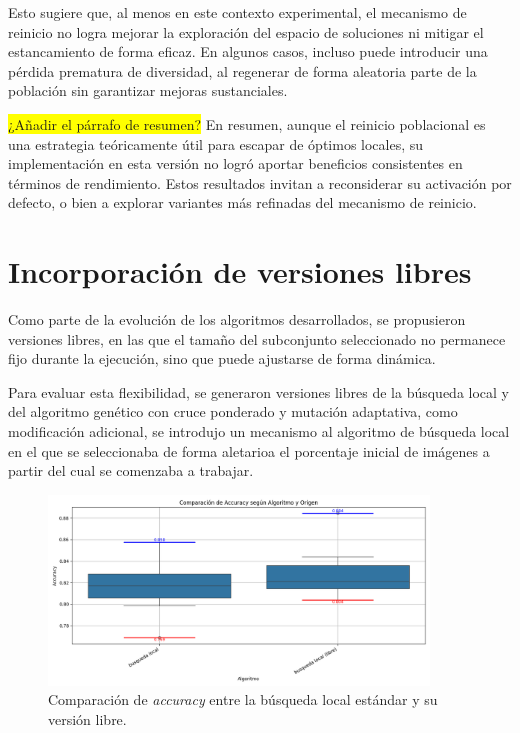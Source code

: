 Esto sugiere que, al menos en este contexto experimental, el mecanismo de reinicio no logra mejorar la exploración del espacio de soluciones 
ni mitigar el estancamiento de forma eficaz.
En algunos casos, incluso puede introducir una pérdida prematura de diversidad, al regenerar de forma aleatoria parte de la población sin garantizar mejoras sustanciales.

\colorbox{yellow}{¿Añadir el párrafo de resumen?}
En resumen, aunque el reinicio poblacional es una estrategia teóricamente útil para escapar de óptimos locales,
su implementación en esta versión no logró aportar beneficios consistentes en términos de rendimiento.
Estos resultados invitan a reconsiderar su activación por defecto, o bien a explorar variantes más refinadas del mecanismo de reinicio.


\section{Incorporación de versiones libres}\label{sec:incorporacion-versiones-libres}
Como parte de la evolución de los algoritmos desarrollados, se propusieron versiones libres,
en las que el tamaño del subconjunto seleccionado no permanece fijo durante la ejecución, sino que puede ajustarse de forma dinámica.

Para evaluar esta flexibilidad, se generaron versiones libres de la búsqueda local y del algoritmo genético con cruce ponderado y mutación adaptativa, 
como modificación adicional, se introdujo un mecanismo al algoritmo de búsqueda local
en el que se seleccionaba de forma aletarioa el porcentaje inicial de imágenes a partir del cual se comenzaba a trabajar.


\begin{figure}[H]
    \centering
    \includegraphics[width=0.9\textwidth]{imagenes/evaluaciones/libres/comparacion_bl}
    \caption{Comparación de \textit{accuracy} entre la búsqueda local estándar y su versión libre.}
    \label{fig:bl_libre}
\end{figure}

